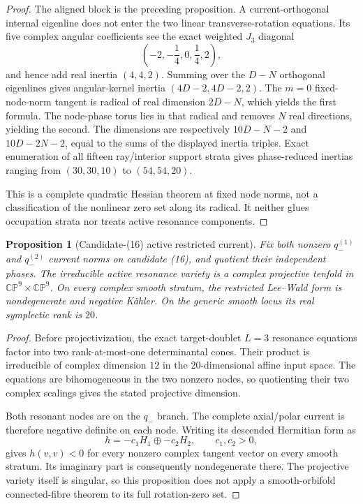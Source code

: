 \documentclass[11pt]{article}
\newtheorem{proposition}[theorem]{Proposition}
\theoremstyle{definition}
\theoremstyle{remark}
\begin{document}
\begin{proof}
The aligned block is the preceding proposition.  A current-orthogonal
internal eigenline does not enter the two linear transverse-rotation
equations.  Its five complex angular coefficients see the exact weighted
\(J_3\) diagonal
\[
 \left(-2,-\frac14,0,\frac14,2\right),
\]
and hence add real inertia \((4,4,2)\).  Summing over the \(D-N\)
orthogonal eigenlines gives angular-kernel inertia
\((4D-2,4D-2,2)\).  The \(m=0\) fixed-node-norm tangent is radical of real
dimension \(2D-N\), which yields the first formula.  The node-phase torus
lies in that radical and removes \(N\) real directions, yielding the second.
The dimensions are respectively \(10D-N-2\) and \(10D-2N-2\), equal to
the sums of the displayed inertia triples.  Exact enumeration of all
fifteen ray/interior support strata gives phase-reduced inertias ranging
from \((30,30,10)\) to \((54,54,20)\).

This is a complete quadratic Hessian theorem at fixed node norms, not a
classification of the nonlinear zero set along its radical.  It neither
glues occupation strata nor treats active resonance components.
\end{proof}

\begin{proposition}[Candidate-(16) active restricted current]
Fix both nonzero \(q_-^{(1)}\) and \(q_-^{(2)}\) current norms on candidate
(16), and quotient their independent phases.  The irreducible active
resonance variety is a complex projective tenfold in
\(\mathbb{CP}^9\times\mathbb{CP}^9\).  On every complex smooth stratum, the restricted
Lee--Wald form is nondegenerate and negative K\"ahler.  On the generic
smooth locus its real symplectic rank is \(20\).
\end{proposition}

\begin{proof}
Before projectivization, the exact target-doublet \(L=3\) resonance equations
factor into two rank-at-most-one determinantal cones.  Their product is
irreducible of complex dimension \(12\) in the \(20\)-dimensional affine
input space.  The equations are bihomogeneous in the two nonzero nodes, so
quotienting their two complex scalings gives the stated projective dimension.

Both resonant nodes are on the \(q_-\) branch.  The complete axial/polar
current is therefore negative definite on each node.  Writing its descended
Hermitian form as
\[
 h=-c_1H_1\mathbin{\oplus}-c_2H_2,
 \qquad c_1,c_2>0,
\]
gives \(h(v,v)<0\) for every nonzero complex tangent vector on every smooth
stratum.  Its imaginary part is consequently nondegenerate there.  The
projective variety itself is singular, so this proposition does not apply a
smooth-orbifold connected-fibre theorem to its full rotation-zero set.
\end{proof}
\end{document}
